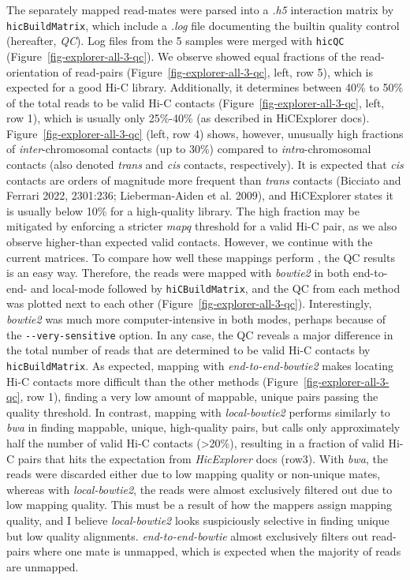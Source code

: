 \documentclass[
  11pt,
  a4paper,
]{scrbook}
\let\oldemph\emph
\renewcommand\emph[1]{\oldemph{\color{gray}#1}}
\begin{document}
The separately mapped read-mates were parsed into a \emph{.h5}
interaction matrix by \texttt{hicBuildMatrix}, which include a
\emph{.log} file documenting the builtin quality control (hereafter,
\emph{QC}). Log files from the 5 samples were merged with \texttt{hicQC}
(Figure~\ref{fig-explorer-all-3-qc}). We observe showed equal fractions
of the read-orientation of read-pairs
(Figure~\ref{fig-explorer-all-3-qc}, left, row 5), which is expected for
a good Hi-C library. Additionally, it determines between 40\% to 50\% of
the total reads to be valid Hi-C contacts
(Figure~\ref{fig-explorer-all-3-qc}, left, row 1), which is usually only
25\%-40\% (as described in HiCExplorer docs).
Figure~\ref{fig-explorer-all-3-qc} (left, row 4) shows, however,
unusually high fractions of \emph{inter}-chromosomal contacts (up to
30\%) compared to \emph{intra}-chromosomal contacts (also denoted
\emph{trans} and \emph{cis} contacts, respectively). It is expected that
\emph{cis} contacts are orders of magnitude more frequent than
\emph{trans} contacts (Bicciato and Ferrari 2022, 2301:236;
Lieberman-Aiden et al. 2009), and HiCExplorer states it is usually below
10\% for a high-quality library. The high fraction may be mitigated by
enforcing a stricter \emph{mapq} threshold for a valid Hi-C pair, as we
also observe higher-than expected valid contacts. However, we continue
with the current matrices. To compare how well these mappings perform ,
the QC results is an easy way. Therefore, the reads were mapped with
\emph{bowtie2} in both end-to-end- and local-mode followed by
\texttt{hiCBuildMatrix}, and the QC from each method was plotted next to
each other (Figure~\ref{fig-explorer-all-3-qc}). Interestingly,
\emph{bowtie2} was much more computer-intensive in both modes, perhaps
because of the \texttt{-\/-very-sensitive} option. In any case, the QC
reveals a major difference in the total number of reads that are
determined to be valid Hi-C contacts by \texttt{hicBuildMatrix}. As
expected, mapping with \emph{end-to-end-bowtie2} makes locating Hi-C
contacts more difficult than the other methods
(Figure~\ref{fig-explorer-all-3-qc}, row 1), finding a very low amount
of mappable, unique pairs passing the quality threshold. In contrast,
mapping with \emph{local-bowtie2} performs similarly to \emph{bwa} in
finding mappable, unique, high-quality pairs, but calls only
approximately half the number of valid Hi-C contacts (\textgreater20\%),
resulting in a fraction of valid Hi-C pairs that hits the expectation
from \emph{HicExplorer} docs (row3). With \emph{bwa}, the reads were
discarded either due to low mapping quality or non-unique mates, whereas
with \emph{local-bowtie2}, the reads were almost exclusively filtered
out due to low mapping quality. This must be a result of how the mappers
assign mapping quality, and I believe \emph{local-bowtie2} looks
suspiciously selective in finding unique but low quality alignments.
\emph{end-to-end-bowtie} almost exclusively filters out read-pairs where
one mate is unmapped, which is expected when the majority of reads are
unmapped.
\end{document}

